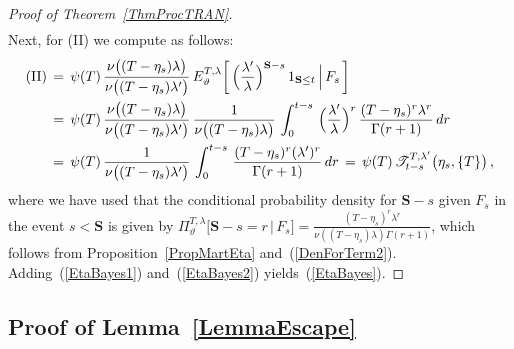 \documentclass[10pt]{article}
\numberwithin{equation}{section}
\theoremstyle{definition}
\begin{document}
\begin{proof}[Proof of Theorem~\ref{ThmProcTRAN}]
\begin{align}
\end{align}
Next, for (II) we compute as follows:
\begin{align} \label{EtaBayes2}
 \textup{(II)}  &\,=\,\psi(T)\,\frac{ \nu\big( (T-\eta_s) \lambda   \big) }{ \nu\big( (T-\eta_s)\lambda'    \big)  } \,E^{T,\lambda }_{\vartheta}\bigg[\, \Big(\frac{\lambda'}{\lambda}\Big)^{\mathbf{S}-s  } \, 1_{\mathbf{S}\leq t} \,\Big|\, F_s \,\bigg] \nonumber \\
  &\,=\,\psi(T)\,\frac{ \nu\big((T-\eta_s)  \lambda   \big) }{ \nu\big( (T-\eta_s) \lambda'   \big)  }\, \frac{1  }{ \nu\big((T-\eta_s) \lambda\big)}\, \int_{0}^{t-s}\, \Big(\frac{\lambda'}{\lambda}\Big)^r \,\frac{(T-\eta_s)^r \lambda^r  }{ \Gamma(r+1) }   \,     dr \nonumber  \\
  &\,=\,\psi(T)\,\frac{ 1}{ \nu\big( (T-\eta_s) \lambda'   \big)  }  \,\int_{0}^{t-s}\,  \frac{(T-\eta_s)^r (\lambda')^r  }{ \Gamma(r+1) }    \,    dr  
  \,=\,\psi(T)  \, \mathscr{T}^{T,\lambda'}_{t-s}\big(\eta_s,\{T\} \big)\,,
\end{align}
where we have used that the conditional probability density for  $\mathbf{S}-s$ given $F_s$ in the event $s<\mathbf{S}$ is given by $ \Pi^{T,\lambda}_{\vartheta}\big[\mathbf{S}-s=r\,|\,F_s  
 \big] =\frac{(T-\eta_s)^r \lambda^r  }{\nu((T-\eta_s) \lambda ) \Gamma(r+1) } $, which  follows from Proposition~\ref{PropMartEta} and~(\ref{DenForTerm2}).  Adding~(\ref{EtaBayes1}) and~(\ref{EtaBayes2}) yields~(\ref{EtaBayes}).
\end{proof}














\subsection{Proof of Lemma~\ref{LemmaEscape}} \label{SubSecSomeTimes}
\end{document}
